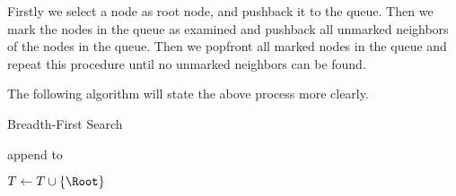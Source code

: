 \begin{questions}
\begin{algorithm}
{            
            
        }

    \end{algorithm}

    Firstly we select a node as root node, and pushback it to the queue. Then we mark the nodes in the queue as examined and pushback all unmarked neighbors of the nodes in the queue. Then we popfront all marked nodes in the queue and repeat this procedure until no unmarked neighbors can be found.

    The following algorithm will state the above process more clearly.

    \begin{algorithm}[h]
        \caption{Breadth-First Search}
        \label{algo-bfs}

        append \Root to \Queue

        $T\gets T\cup\left\{\Root\right\}$




    \end{algorithm}


\end{questions}



